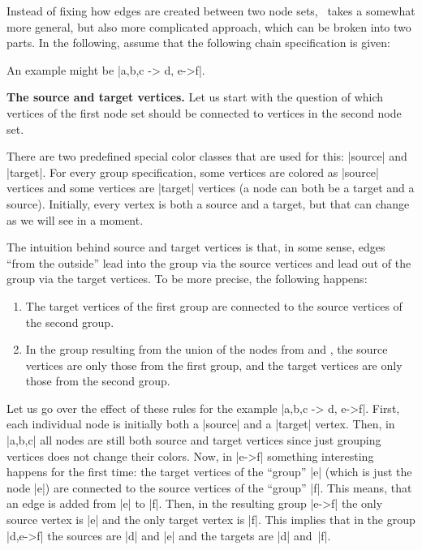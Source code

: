 Instead of fixing how edges are created between two node sets, \tikzname\ takes
a somewhat more general, but also more complicated approach, which can be
broken into two parts. In the following, assume that the following chain
specification is given:
%
\begin{quote}
      
\end{quote}
%
An example might be |{a,b,c} -> {d, e->f}|.

\medskip
\textbf{The source and target vertices.} Let us start with the question of
which vertices of the first node set should be connected to vertices in the
second node set.

There are two predefined special color classes that are used for this: |source|
and |target|. For every group specification, some vertices are colored as
|source| vertices and some vertices are |target| vertices (a node can both be a
target and a source). Initially, every vertex is both a source and a target,
but that can change as we will see in a moment.

The intuition behind source and target vertices is that, in some sense, edges
``from the outside'' lead into the group via the source vertices and lead out
of the group via the target vertices. To be more precise, the following
happens:
%
\begin{enumerate}
    \item The target vertices of the first group are connected to the source
        vertices of the second group.
    \item In the group resulting from the union of the nodes from
         and , the source vertices are only those
        from the first group, and the target vertices are only those from the
        second group.
\end{enumerate}

Let us go over the effect of these rules for the example
|{a,b,c} -> {d, e->f}|. First, each individual node is initially both a
|source| and a |target| vertex. Then, in |{a,b,c}| all nodes are still both
source and target vertices since just grouping vertices does not change their
colors. Now, in |e->f| something interesting happens for the first time: the
target vertices of the ``group'' |e| (which is just the node |e|) are connected
to the source vertices of the ``group'' |f|. This means, that an edge is added
from |e| to |f|. Then, in the resulting group |e->f| the only source vertex is
|e| and the only target vertex is |f|. This implies that in the group
|{d,e->f}| the sources are |d| and |e| and the targets are |d| and~|f|.

